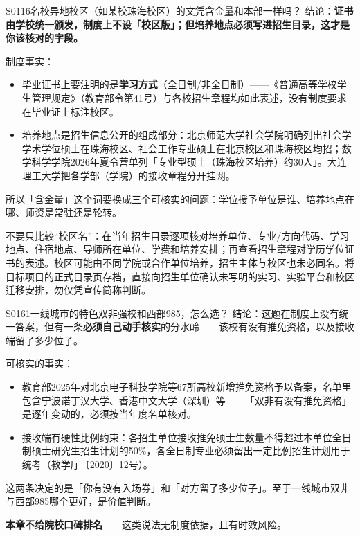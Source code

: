 \begin{qa}{S0116}{名校异地校区（如某校珠海校区）的文凭含金量和本部一样吗？}
结论：\textbf{证书由学校统一颁发，制度上不设「校区版」；但培养地点必须写进招生目录，这才是你该核对的字段。}

制度事实：
\begin{itemize}
  \item 毕业证书上要注明的是\textbf{学习方式}（全日制/非全日制）——《普通高等学校学生管理规定》（教育部令第41号）与各校招生章程均如此表述，没有制度要求在毕业证上标注校区。
  \item 培养地点是招生信息公开的组成部分：北京师范大学社会学院明确列出社会学学术学位硕士在珠海校区、社会工作专业硕士在北京校区和珠海校区均招；数学科学学院2026年夏令营单列「专业型硕士（珠海校区培养）约30人」。大连理工大学把各学部（学院）的接收章程分开挂网。
\end{itemize}

所以「含金量」这个词要换成三个可核实的问题：学位授予单位是谁、培养地点在哪、师资是常驻还是轮转。

不要只比较“校区名”：在当年招生目录逐项核对培养单位、专业/方向代码、学习地点、住宿地点、导师所在单位、学费和培养安排；再查看招生章程对学历学位证书的表述。校区可能由不同学院或合作单位培养，招生主体与校区也未必同名。将目标项目的正式目录页存档，直接向招生单位确认未写明的实习、实验平台和校区迁移安排，勿仅凭宣传简称判断。
\end{qa}

\begin{qa}{S0161}{一线城市的特色双非强校和西部985，怎么选？}
结论：这题在制度上没有统一答案，但有一条\textbf{必须自己动手核实}的分水岭——该校有没有推免资格，以及接收端留了多少位子。

可核实的事实：
\begin{itemize}
  \item 教育部2025年对北京电子科技学院等67所高校新增推免资格予以备案，名单里包含宁波诺丁汉大学、香港中文大学（深圳）等——「双非有没有推免资格」是逐年变动的，必须按当年度名单核对。
  \item 接收端有硬性比例约束：各招生单位接收推免硕士生数量不得超过本单位全日制硕士研究生招生计划的50\%，各全日制专业必须留出一定比例招生计划用于统考（教学厅〔2020〕12号）。
\end{itemize}

这两条决定的是「你有没有入场券」和「对方留了多少位子」。至于一线城市双非与西部985哪个更好，是价值判断。

\textbf{本章不给院校口碑排名}——这类说法无制度依据，且有时效风险。
\end{qa}

